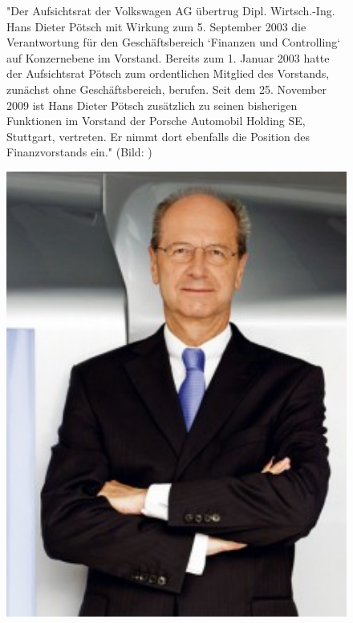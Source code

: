 \documentclass[12pt]{article}
\begin{document}
\begin{figure}[!h]
	\centering
	\begin{minipage}[h]{0.65\textwidth}
		"Der Aufsichtsrat der Volkswagen AG übertrug Dipl. Wirtsch.-Ing. Hans Dieter Pötsch mit Wirkung zum 5. September 2003 die Verantwortung für den Geschäftsbereich ‘Finanzen und Controlling‘ auf Konzernebene im Vorstand. Bereits zum 1. Januar 2003 hatte der Aufsichtsrat Pötsch zum ordentlichen Mitglied des Vorstands, zunächst ohne Geschäftsbereich, berufen. Seit dem 25. November 2009 ist Hans Dieter Pötsch zusätzlich zu seinen bisherigen Funktionen im Vorstand der Porsche Automobil Holding SE, Stuttgart, vertreten. Er nimmt dort ebenfalls die Position des Finanzvorstands ein."\cite{poetschbio}  (Bild: \cite{dppic} )
	\end{minipage}
	\begin{minipage}[h]{0.10\textwidth}
		\hspace{1cm} 
	\end{minipage}
	\begin{minipage}[h]{0.20\textwidth}
		\centering
		\includegraphics[width=1.0\textwidth]{images/HansPoetsch.jpg}
		\label{fig:vorstandvw7}
	\end{minipage}
\end{figure}
\end{document}
